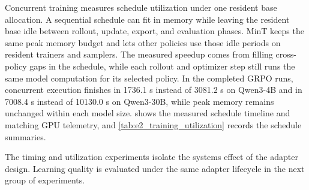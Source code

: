 \begin{table}[H]
\centering
\scriptsize
\setlength{\tabcolsep}{3pt}
\renewcommand{\arraystretch}{1.05}
\caption{File and sampling metrics for the adapter-handoff comparison in \cref{fig:e1_handoff_breakdown}. Cold first sample is the first request wall time. The total sample speed includes that first request, while the warm sample speed excludes it.}
\label{tab:e1_handoff_paths}
\end{table}

Concurrent training measures schedule utilization under one resident base allocation. A sequential schedule can fit in memory while leaving the resident base idle between rollout, update, export, and evaluation phases. MinT keeps the same peak memory budget and lets other policies use those idle periods on resident trainers and samplers. The measured speedup comes from filling cross-policy gaps in the schedule, while each rollout and optimizer step still runs the same model computation for its selected policy. In the completed GRPO runs, concurrent execution finishes in 1736.1 s instead of 3081.2 s on Qwen3-4B and in 7008.4 s instead of 10130.0 s on Qwen3-30B, while peak memory remains unchanged within each model size.  shows the measured schedule timeline and matching GPU telemetry, and \cref{tab:e2_training_utilization} records the schedule summaries.

The timing and utilization experiments isolate the systems effect of the adapter design. Learning quality is evaluated under the same adapter lifecycle in the next group of experiments.
\FloatBarrier

